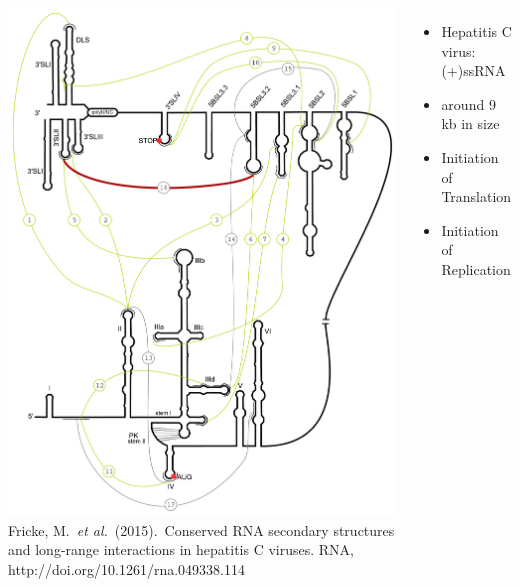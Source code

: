 \begin{frame}[c]
\begin{columns}
\begin{overlayarea}{\linewidth}{\textheight}
{  \includegraphics[height=0.7\textheight]{figures/long_range_hcv_repli.pdf}\\%
  \tiny{Fricke, M.~\textit{et al.}~(2015).~Conserved RNA secondary structures and long-range interactions in hepatitis C viruses. RNA, http://doi.org/10.1261/rna.049338.114}%
  }
\end{overlayarea}
  \vspace{-5cm}
  \begin{itemize}
      \item<1-> Hepatitis C virus: (+)ssRNA
      \item<1-> around 9\,kb in size\\[2em]
      \item<2-> Initiation of Translation
      \item<3-> Initiation of Replication
    \end{itemize}
  \end{columns} 
\end{frame}

